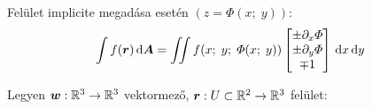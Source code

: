 \documentclass[main.tex]{subfiles}
\begin{document}



Felület implicite megadása esetén
$\left( z = \varPhi(x ;\; y) \right)$:
\begin{equation*}
  \int f(\rvec{r}) \, \differential \rvec{A}
  =
  \iint f(x ;\; y ;\; \varPhi(x ;\; y))
  \begin{bmatrix}
    \pm \partial_x \varPhi \\
    \pm \partial_y \varPhi \\
    \mp 1
  \end{bmatrix}
  \, \differential x \, \differential y
\end{equation*}




Legyen $\bm{w}: \mathbb{R}^3 \rightarrow \mathbb{R}^3$ vektormező,
$\bm{r}: U \subset \mathbb{R}^2 \rightarrow \mathbb{R}^3$ felület:
\end{document}
